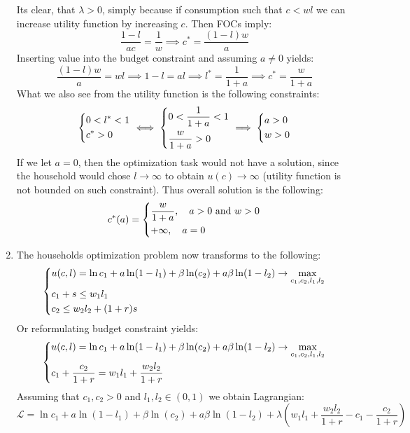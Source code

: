 \documentclass[11pt, oneside]{article}
\renewcommand{\b}{\beta}
\begin{document}
\begin{enumerate}[(1)]
 Its clear, that $ \lambda > 0 $, simply because if consumption such that $ c < wl $ we can increase utility function by increasing $ c $. Then FOCs imply:
		\[
		\frac{1-l}{ac} = \frac{1}{w} \implies c^{*} = \frac{(1-l)w}{a}
		\]
		Inserting value into the budget constraint and assuming $ a \ne 0$ yields:
		\[
		\frac{(1-l)w}{a} = wl \implies 1-l = al \implies l^{*} = \frac{1}{1+a} \implies c^{*} = \frac{w}{1+a}
		\]
		What we also see from the utility function is the following constraints:
		\[
		\begin{dcases}
			0< l^{*} < 1 \\
			c^{*} > 0
		\end{dcases} \iff 
			\begin{dcases}
		0<  \frac{1}{1+a} < 1 \\
		\frac{w}{1+a} > 0
	\end{dcases} \implies 
\begin{dcases}
	a > 0 \\ w>0
\end{dcases}
		\]
		If we let $ a =0 $, then the optimization task would not have a solution, since the household would chose $ l \to \infty $ to obtain $ u(c) \to \infty$ (utility function is not bounded on such constraint). Thus overall solution is the following:
		\[
		c^{*}(a) = \begin{dcases}
			\frac{w}{1+a}, \quad a > 0 \text{ and } w> 0 \\
			+\infty, \quad a = 0
		\end{dcases}
		\]
		\item The households optimization problem now transforms to the following:
		\[
		\begin{dcases}
			u(c, l) = \ln c_{1} + a\ln(1-l_{1}) + \b\ln(c_{2}) + a \b\ln(1 - l_{2})  \to \max_{c_{1}, c_{2}, l_{1}, l_{2}} \\
			c_{1} + s \le w_{1}l_{1} \\
			c_{2} \le w_{2}l_{2} + (1+r)s
		\end{dcases}
		\]
		Or reformulating budget constraint yields:
		\[
		\begin{dcases}
			u(c, l) = \ln c_{1} + a\ln(1-l_{1}) + \b\ln(c_{2}) + a \b\ln(1 - l_{2})  \to \max_{c_{1}, c_{2}, l_{1}, l_{2}} \\
		c_{1} + \frac{c_{2}}{1+r} = w_{1}l_{1} + \frac{w_{2}l_{2}}{1+r}
		\end{dcases}
		\]
		Assuming that $ c_{1}, c_{2} > 0$ and $ l_{1}, l_{2} \in (0, 1) $ we obtain Lagrangian:
	\[
	\mathcal{L} = \ln c_{1} + a\ln(1-l_{1}) + \b\ln(c_{2}) + a \b\ln(1 - l_{2}) + \lambda \left( w_{1}l_{1} + \frac{w_{2}l_{2}}{1+r} - c_{1} - \frac{c_{2}}{1+r} \right)
\]
\end{enumerate}
\end{document}
